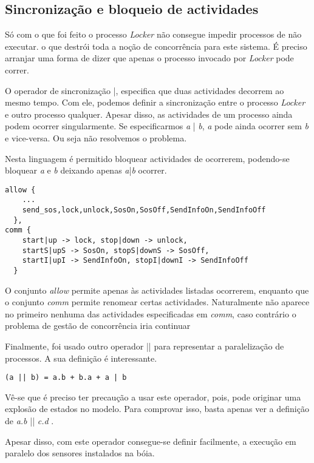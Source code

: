 \documentclass[a4paper,11pt]{article}
\begin{document}
\subsection{Sincronização e bloqueio de actividades}

Só com o que foi feito o processo \emph{Locker} não consegue impedir processos de não executar. 
o que destrói toda a noção de concorrência para este sistema. É preciso arranjar uma forma de dizer que apenas o processo invocado por \emph{Locker}
pode correr.\par
O operador de sincronização |, especifica que duas actividades decorrem ao mesmo tempo. 
Com ele, podemos definir a sincronização entre o processo \emph{Locker} e outro processo qualquer.
Apesar disso, as actividades de um processo ainda podem ocorrer singularmente. Se especificarmos \emph{a} | \emph{b}, \emph{a} 
pode ainda ocorrer sem \emph{b} e vice-versa. Ou seja não resolvemos o problema. \par Nesta linguagem é 
permitido bloquear actividades de ocorrerem, podendo-se bloquear \emph{a} e \emph{b} deixando apenas \emph{a}|\emph{b} ocorrer.

\begin{lstlisting}
allow {	
	...
	send_sos,lock,unlock,SosOn,SosOff,SendInfoOn,SendInfoOff
  },
comm { 
	start|up -> lock, stop|down -> unlock, 
	startS|upS -> SosOn, stopS|downS -> SosOff, 
	startI|upI -> SendInfoOn, stopI|downI -> SendInfoOff  
  }
\end{lstlisting}

O conjunto \emph{allow} permite apenas às actividades listadas ocorrerem, enquanto que o conjunto \emph{comm} permite renomear certas actividades. 
Naturalmente não aparece no primeiro nenhuma das actividades especificadas em \emph{comm}, caso contrário o problema de gestão de concorrência iria continuar
\par Finalmente, foi usado outro operador || para representar a paralelização de processos. A sua definição é interessante.   

\begin{lstlisting}
(a || b) = a.b + b.a + a | b 
\end{lstlisting}

Vê-se que é preciso ter precaução a usar este operador, pois, pode originar uma explosão de estados no modelo. Para comprovar isso, basta apenas ver
a definição de \emph{ a.b} || \emph{c.d} \cite{ref3}. \par
Apesar disso, com este operador consegue-se definir facilmente, a execução em paralelo dos sensores instalados na bóia.  
\end{document}
